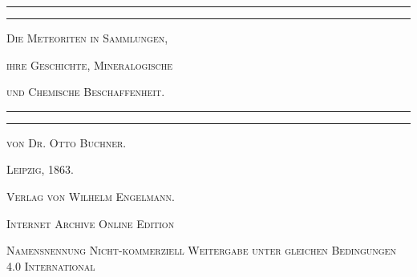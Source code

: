 \documentclass[a4paper, 11pt, oneside]{article}
\begin{document}
\setlength{\cftsubsecnumwidth}{3em}
\begin{titlepage} %
	\centering %

	
	\rule{\textwidth}{1.6pt}\vspace*{-\baselineskip}\vspace*{2pt} %
	\rule{\textwidth}{0.4pt} %
	
	\vspace{1.5\baselineskip} %
	
	{\scshape\LARGE Die Meteoriten in Sammlungen,}
	
	\vspace{1\baselineskip} %

	{\scshape\LARGE ihre Geschichte, Mineralogische}

	\vspace{1\baselineskip} %

	{\scshape\LARGE und Chemische Beschaffenheit.}

	\vspace{1.5\baselineskip} %

	\rule{\textwidth}{0.4pt}\vspace*{-\baselineskip}\vspace{3.2pt} %
	\rule{\textwidth}{1.6pt} %
	
	\vspace{1\baselineskip} %
	
	
	{\scshape von Dr. Otto Buchner.} %
	
	\vspace*{1\baselineskip} %
	
    
    \vspace*{\fill}

	\vspace{1\baselineskip}

	{\small\scshape Leipzig, 1863.}
	
	{\small\scshape{Verlag von Wilhelm Engelmann.}}
	
	\vspace{0.5\baselineskip} %

    \scshape Internet Archive Online Edition  %
	
	{\scshape\small Namensnennung Nicht-kommerziell Weitergabe unter gleichen Bedingungen 4.0 International} %
\end{titlepage}
\end{document}
